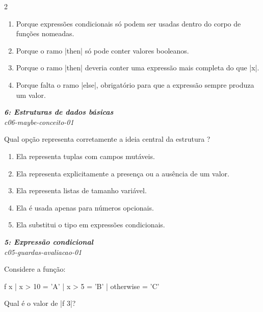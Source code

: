 \documentclass[a4paper,10pt,brazil]{article}
\begin{document}
\begin{multicols}{2}
\begin{enumerate}
  \item Porque expressões condicionais só podem ser usadas dentro do corpo de funções nomeadas.

  \item Porque o ramo \haskellinline|then| só pode conter valores booleanos.

  \item Porque o ramo \haskellinline|then| deveria conter uma expressão mais completa do que \haskellinline|x|.

  \item Porque falta o ramo \haskellinline|else|, obrigatório para que a expressão sempre produza um valor.


\end{enumerate}

\begin{flushright}
  \footnotesize
  \textit{\textbf{6: Estruturas de dados básicas}}\\
  \textit{c06-maybe-conceito-01}\\

\end{flushright}
Qual opção representa corretamente a ideia central da estrutura ?

\begin{enumerate}
  \item Ela representa tuplas com campos mutáveis.

  \item Ela representa explicitamente a presença ou a ausência de um valor.

  \item Ela representa listas de tamanho variável.

  \item Ela é usada apenas para números opcionais.

  \item Ela substitui o tipo  em expressões condicionais.


\end{enumerate}

\begin{flushright}
  \footnotesize
  \textit{\textbf{5: Expressão condicional}}\\
  \textit{c05-guardas-avaliacao-01}\\

\end{flushright}
Considere a função:
\begin{haskellcode}
f x
  | x > 10 = 'A'
  | x > 5  = 'B'
  | otherwise = 'C'
\end{haskellcode}
Qual é o valor de \haskellinline|f 3|?


\end{multicols}
\end{document}
